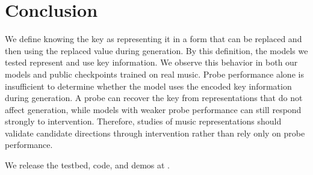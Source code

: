 \documentclass{article}
\begin{document}
\section{Conclusion}
We define knowing the key as representing it in a form that can be replaced and then using the replaced value during generation.
By this definition, the models we tested represent and use key information.
We observe this behavior in both our models and public checkpoints trained on real music.
Probe performance alone is insufficient to determine whether the model uses the encoded key information during generation.
A probe can recover the key from representations that do not affect generation, while models with weaker probe performance can still respond strongly to intervention.
Therefore, studies of music representations should validate candidate directions through intervention rather than rely only on probe performance.

We release the testbed, code, and demos at \repourl.



\end{document}
